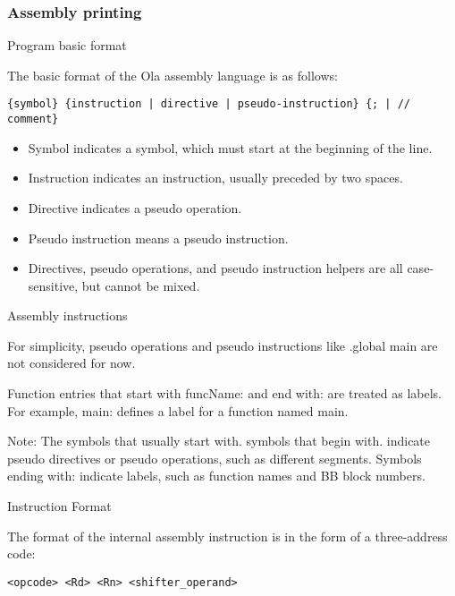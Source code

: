 \subsubsection{Assembly printing}

Program basic format\par
The basic format of the Ola assembly language is as follows:
\begin{lstlisting}[language={}]
{symbol} {instruction | directive | pseudo-instruction} {; | // comment}
\end{lstlisting}

\begin{itemize}
    \item Symbol indicates a symbol, which must start at the beginning of the line.\par
    \item Instruction indicates an instruction, usually preceded by two spaces.\par
    \item Directive indicates a pseudo operation.\par
    \item Pseudo instruction means a pseudo instruction.\par
    \item Directives, pseudo operations, and pseudo instruction helpers are all case-sensitive, but cannot be mixed.
\end{itemize}

Assembly instructions\par

For simplicity, pseudo operations and pseudo instructions like .global main are not considered for now.\par

Function entries that start with funcName: and end with: are treated as labels. For example, main: defines a label for a function named main.

Note: The symbols that usually start with. symbols that begin with. indicate pseudo directives or pseudo operations, such as different segments. Symbols ending with: indicate labels, such as function names and BB block numbers.

Instruction Format\par
The format of the internal assembly instruction is in the form of a three-address code:
\begin{lstlisting}[language={}]
    <opcode> <Rd> <Rn> <shifter_operand>
\end{lstlisting}

